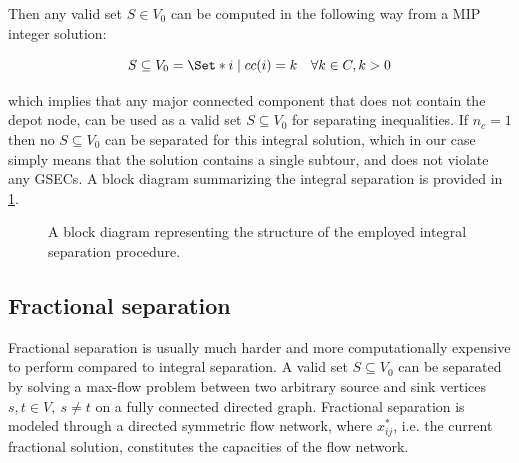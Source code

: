 Then any valid set $S \in V_0$ can be computed in the following way from a MIP integer solution:

\begin{equation}
	S \subseteq V_0 = \Set* {i \mid cc(i) = k}   \quad \forall k \in C, k > 0
\end{equation}

which implies that any major connected component that does not contain the depot node, can be used as a valid set $S \subseteq V_0$ for separating inequalities.
If $n_c = 1$ then no $S \subseteq V_0$ can be separated for this integral solution, which in our case simply means that the solution contains a single subtour, and does not violate any GSECs.
A block diagram summarizing the integral separation is provided in \cref{fig:integral-separation-block-diagram}.

\begin{figure}[ht]
	\centering
	\caption{A block diagram representing the structure of the employed integral separation procedure.}
	\label{fig:integral-separation-block-diagram}
\end{figure}

\subsection{Fractional separation}
\label{sec:impl-fractional-separation}

Fractional separation is usually much harder and more computationally expensive to perform compared to integral separation.
A valid set $S \subseteq V_0$ can be separated by solving a max-flow problem between two arbitrary source and sink vertices $s, t \in V,\ s \ne t$ on a fully connected directed graph.
Fractional separation is modeled through a directed symmetric flow network, where $x^*_{ij}$, i.e. the current fractional solution, constitutes the capacities of the flow network.

